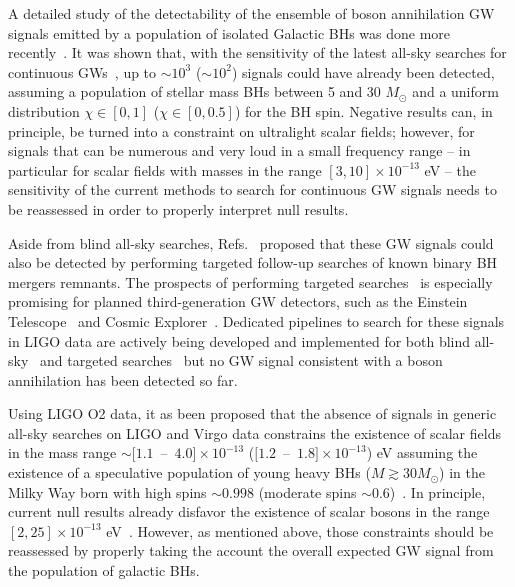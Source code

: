 \documentclass[11pt]{article}
\numberwithin{equation}{section} %
\begin{document}
A detailed study of the detectability of the ensemble of boson annihilation GW signals emitted by a population of isolated Galactic BHs was done more recently~\cite{Zhu:2020tht}. It was shown that, with the sensitivity of the latest all-sky searches for continuous GWs~\cite{Palomba:2019vxe,Dergachev:2019wqa,Dergachev:2019oyu,Pisarski:2019vxw}, up to $\sim 10^3$ ($\sim 10^2$) signals could have already been detected, assuming a population of stellar mass BHs between 5 and 30 $M_{\odot}$ and a uniform distribution $\chi\in [0,1]$ ($\chi \in [0,0.5]$) for the BH spin. Negative results can, in principle, be turned into a constraint on ultralight scalar fields; however, for signals that can be numerous and very loud in a small frequency range -- in particular for scalar fields with masses in the range $[3,10]\times 10^{-13}$ eV -- the sensitivity of the current methods to search for continuous GW signals needs to be reassessed in order to properly interpret null results. 


Aside from blind all-sky searches, Refs.~\cite{Arvanitaki:2016qwi,Baryakhtar:2017ngi} proposed that these GW signals could also be detected by performing targeted follow-up searches of known binary BH mergers remnants. The prospects of performing targeted searches~\cite{Arvanitaki:2016qwi,Baryakhtar:2017ngi,Isi:2018pzk,Ghosh:2018gaw} is especially promising for planned third-generation GW detectors, such as the Einstein Telescope~\cite{Hild:2010id} and Cosmic Explorer~\cite{Evans:2016mbw,Essick:2017wyl}. Dedicated pipelines to search for these signals in LIGO data are actively being developed and implemented for both blind all-sky~\cite{DAntonio:2018sff,Palomba:2019vxe,Dergachev:2019wqa,Dergachev:2019oyu,Zhu:2020tht} and targeted searches~\cite{Isi:2018pzk,Sun:2019mqb} but no GW signal consistent with a boson annihilation has been detected so far. 

Using LIGO O2 data, it as been proposed that the absence of signals in generic all-sky searches on LIGO and Virgo data constrains the existence of scalar fields in the mass range $\sim [1.1$~--~$4.0]\times 10^{-13}$ ($[1.2$~--~$ 1.8]\times 10^{-13}$) eV assuming the existence of a speculative population of young heavy BHs ($M\gtrsim 30 M_{\odot}$) in the Milky Way born with high spins $\sim 0.998$ (moderate spins $\sim 0.6$)~\cite{Palomba:2019vxe}. In principle, current null results already disfavor the existence of scalar bosons in the range $[2,25]\times 10^{-13}$ eV~\cite{Zhu:2020tht}. However, as mentioned above, those constraints should be reassessed by properly taking the account the overall expected GW signal from the population of galactic BHs.
 
\end{document}
